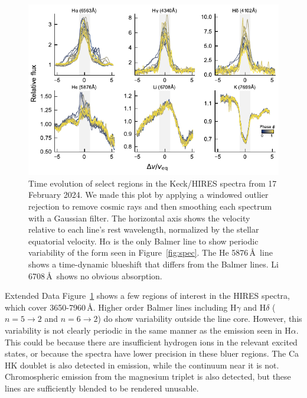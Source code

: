 \documentclass{nature3}
\begin{document}
\begin{methods}
\begin{figure}[!t]
  \centering
  \includegraphics[width=\textwidth]{figures/sf5.pdf}
  \caption{Time evolution of select regions in the Keck/HIRES
  spectra from 17 February 2024.
  We made this plot by applying a windowed outlier rejection to remove
  cosmic rays and then smoothing each spectrum with a Gaussian filter.
  The horizontal axis shows the velocity relative to each
  line's rest wavelength, normalized by the stellar equatorial
  velocity.  
  H$\alpha$ is the only Balmer line to show periodic variability of
  the form seen in Figure~\ref{fig:spec}.
  The He 5876\,\AA\ line shows a time-dynamic blueshift that 
  differs from the Balmer lines.
  Li 6708\,\AA\ shows no obvious absorption.
  }
  \label{fig:hirescuts}
\end{figure}

Extended Data Figure~\ref{fig:hirescuts} shows a few regions of interest in the
HIRES spectra, which cover 3650-7960\,\AA.  Higher order Balmer lines
including H$\gamma$ and H$\delta$ ($n=5\rightarrow2$ and
$n=6\rightarrow2$) do show variability outside the line core.
However, this variability is not clearly periodic in the same manner
as the emission seen in H$\alpha$.  This could be because there are
insufficient hydrogen ions in the relevant excited states, or because
the spectra have lower precision in these bluer regions.  The Ca HK
doublet is also detected in emission, while the continuum near it is
not.  Chromospheric emission from the magnesium triplet is also
detected, but these lines are sufficiently blended to be rendered
unusable.


\end{methods}
\end{document}
